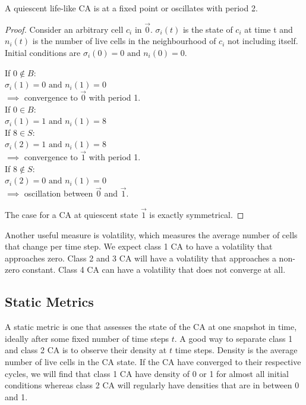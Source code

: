 \begin{lemma}
A quiescent life-like CA is at a fixed point or oscillates with period 2.   
\end{lemma}

\begin{proof} \label{quiescent-nullity}
Consider an arbitrary cell $c_i$ in $\vec{0}$. $\sigma_i(t)$ is the state of $c_i$ at time t and $n_i(t)$ is the number of live cells in the neighbourhood of $c_i$ not including itself. Initial conditions are $\sigma_i(0) = 0 \text{\ and\ } n_i(0) = 0$.
\begin{multicols}{2}
\noindent If $0 \notin B$:\\
\null \quad $\sigma_i(1) = 0 \text{\ and\ } n_i(1) = 0 $\\
\null \quad $\implies$ convergence to $\vec{0}$ with period 1.\\
\columnbreak\linebreak
\noindent If $0 \in B$:\\
\null \quad $\sigma_i(1) = 1 \text{\ and\ } n_i(1) = 8 $\\
\null \quad If $8 \in S$:\\
\null \qquad $\sigma_i(2) = 1 \text{\ and\ } n_i(1) = 8 $\\
\null \qquad $\implies$ convergence to $\vec{1}$ with period 1.\\
\null \quad If $8 \notin S$:\\
\null \qquad $\sigma_i(2) = 0 \text{\ and\ } n_i(1) = 0 $\\
\null \qquad $\implies$ oscillation between $\vec{0}$ and $\vec{1}$.
\end{multicols}
\noindent The case for a CA at quiescent state $\vec{1}$ is exactly symmetrical.
\end{proof}


Another useful measure is volatility, which measures the average number of cells that change per time step. We expect class 1 CA to have a volatility that approaches zero. Class 2 and 3 CA will have a volatility that approaches a non-zero constant. Class 4 CA can have a volatility that does not converge at all.\\

\subsection{Static Metrics} 

A static metric is one that assesses the state of the CA at one snapshot in time, ideally after some fixed number of time steps $t$.
A good way to separate class 1 and class 2 CA is to observe their density at $t$ time steps. Density is the average number of live cells in the CA state. If the CA have converged to their respective cycles, we will find that class 1 CA have density of 0 or 1 for almost all initial conditions whereas class 2 CA will regularly have densities that are in between 0 and 1.\\

